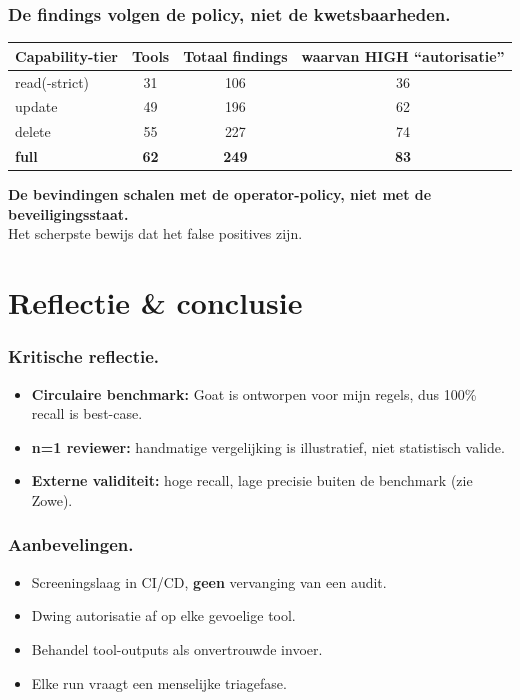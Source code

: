 \documentclass[aspectratio=169]{beamer}
\newcommand{\posternav}[4]{}
\begin{document}
\begin{frame}
  \frametitle{De findings volgen de policy, niet de kwetsbaarheden.}
  \centering
  \begin{tabular}{@{}lccc@{}}
    \toprule
    \textbf{Capability-tier} & \textbf{Tools} & \textbf{Totaal findings} & \textbf{waarvan HIGH ``autorisatie''} \\ \midrule
    read(-strict) & 31 & 106 & 36 \\
    update        & 49 & 196 & 62 \\
    delete        & 55 & 227 & 74 \\
    \textbf{full} & \textbf{62} & \textbf{249} & \textbf{83} \\ \bottomrule
  \end{tabular}
  \vfill
  \centering\textbf{De bevindingen schalen met de operator-policy, niet met de
  beveiligingsstaat.}\\ Het scherpste bewijs dat het false positives zijn.
\end{frame}

\section{Reflectie \& conclusie}

\begin{frame}
  \frametitle{Kritische reflectie.}
  \begin{itemize}
    \item \textbf{Circulaire benchmark:} Goat is ontworpen voor mijn regels,
          dus 100\% recall is best-case.
    \item \textbf{n=1 reviewer:} handmatige vergelijking is illustratief, niet
          statistisch valide.
    \item \textbf{Externe validiteit:} hoge recall, lage precisie buiten de
          benchmark (zie Zowe).
  \end{itemize}
  \posternav{0.52}{0.42}{0.98}{0.72}   %
\end{frame}

\begin{frame}
  \frametitle{Aanbevelingen.}
  \begin{itemize}
    \item Screeningslaag in CI/CD, \textbf{geen} vervanging van een audit.
    \item Dwing autorisatie af op elke gevoelige tool.
    \item Behandel tool-outputs als onvertrouwde invoer.
    \item Elke run vraagt een menselijke triagefase.
  \end{itemize}
  \posternav{0.52}{0.20}{0.98}{0.42}   %
\end{frame}
\end{document}
